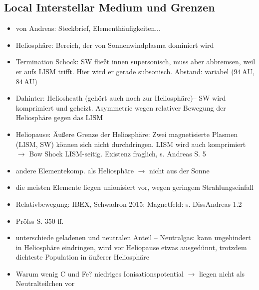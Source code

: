 \documentclass[]{article}
\begin{document}
\subsection{Local Interstellar Medium und Grenzen}
\begin{itemize}
	\item von Andreas: Steckbrief, Elementhäufigkeiten...
	\item Heliosphäre: Bereich, der von Sonnenwindplasma dominiert wird
	\item Termination Schock: SW fließt innen supersonisch, muss aber abbremsen, weil er aufs LISM trifft. Hier wird er gerade subsonisch. Abstand: variabel ($94\,\mathrm{AU}$, $84\,\mathrm{AU}$) 
	\item Dahinter: Heliosheath (gehört auch noch zur Heliosphäre)-- SW wird komprimiert und geheizt. Asymmetrie wegen relativer Bewegung der Heliosphäre gegen das LISM
	\item Heliopause: Äußere Grenze der Heliosphäre: Zwei magnetisierte Plasmen (LISM, SW) können sich nicht durchdringen. LISM wird auch komprimiert $\rightarrow$ Bow Shock LISM-seitig. Existenz fraglich, s. Andreas S. 5
	\item andere Elementekomp. als Heliosphäre $\rightarrow$ nicht aus der Sonne
	\item die meisten Elemente liegen unionisiert vor, wegen geringem Strahlungseinfall
	\item Relativbewegung: IBEX, Schwadron 2015; Magnetfeld: s. DissAndreas 1.2
	\item Prölss S. 350 ff.
	\item unterschiede geladenen und neutralen Anteil -- Neutralgas: kann ungehindert in Heliosphäre eindringen, wird vor Heliopause etwas ausgedünnt, trotzdem dichteste Population in äußerer Heliosphäre
	\item Warum wenig C und Fe? niedriges Ionisationspotential $\rightarrow$ liegen nicht als Neutralteilchen vor
\end{itemize}
%
%
%
\newpage
\end{document}
